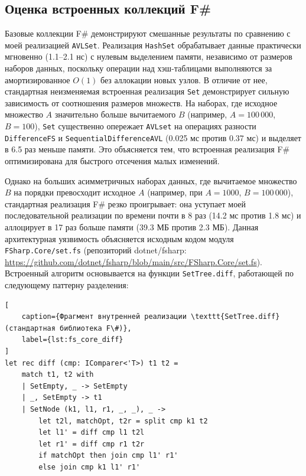 \documentclass[a4paper,12pt]{article}
\begin{document}
\subsection{Оценка встроенных коллекций F\#}
Базовые коллекции F\# демонстрируют смешанные результаты по сравнению с моей реализацией \verb|AVLSet|. Реализация \verb|HashSet| обрабатывает данные практически мгновенно (1.1--2.1 нс) с нулевым выделением памяти, независимо от размеров наборов данных, поскольку операции над хэш-таблицами выполняются за амортизированное $O(1)$ без аллокации новых узлов. В отличие от нее, стандартная неизменяемая встроенная реализация \verb|Set| демонстрирует сильную зависимость от соотношения размеров множеств. На наборах, где исходное множество $A$ значительно больше вычитаемого $B$ (например, $A=100\,000$, $B=100$), \verb|Set| существенно опережает \verb|AVLset| на операциях разности \verb|DifferenceFS| и \verb|SequentialDifferenceAVL| (0.025 мс против 0.37 мс) и выделяет в 6.5 раз меньше памяти. Это объясняется тем, что встроенная реализация F\# оптимизирована для быстрого отсечения малых изменений.

Однако на больших асимметричных наборах данных, где вычитаемое множество $B$ на порядки превосходит исходное $A$ (например, при $A=1000$, $B=100\,000$), стандартная реализация F\# резко проигрывает: она уступает моей последовательной реализации по времени почти в 8 раз (14.2 мс против 1.8 мс) и аллоцирует в 17 раз больше памяти (39.3 МБ против 2.3 МБ). Данная архитектурная уязвимость объясняется исходным кодом модуля \verb|FSharp.Core/set.fs| (репозиторий dotnet/fsharp: \url{https://github.com/dotnet/fsharp/blob/main/src/FSharp.Core/set.fs}). Встроенный алгоритм основывается на функции \verb|SetTree.diff|, работающей по следующему паттерну разделения:
\begin{lstlisting}[
    caption={Фрагмент внутренней реализации \texttt{SetTree.diff} (стандартная библиотека F\#)}, 
    label={lst:fs_core_diff}
]
let rec diff (cmp: IComparer<'T>) t1 t2 =
    match t1, t2 with
    | SetEmpty, _ -> SetEmpty
    | _, SetEmpty -> t1
    | SetNode (k1, l1, r1, _, _), _ ->
        let t2l, matchOpt, t2r = split cmp k1 t2
        let l1' = diff cmp l1 t2l
        let r1' = diff cmp r1 t2r
        if matchOpt then join cmp l1' r1'
        else join cmp k1 l1' r1'
\end{lstlisting}
\end{document}
